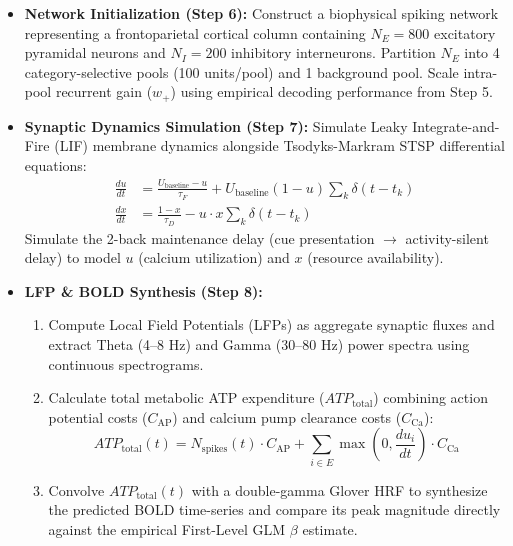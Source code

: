 \documentclass[11pt,a4paper]{article}
\begin{document}
\begin{itemize}
    \item \textbf{Network Initialization (Step 6):} Construct a biophysical spiking network representing a frontoparietal cortical column containing $N_E = 800$ excitatory pyramidal neurons and $N_I = 200$ inhibitory interneurons. Partition $N_E$ into 4 category-selective pools (100 units/pool) and 1 background pool. Scale intra-pool recurrent gain ($w_+$) using empirical decoding performance from Step 5.
    \item \textbf{Synaptic Dynamics Simulation (Step 7):} Simulate Leaky Integrate-and-Fire (LIF) membrane dynamics alongside Tsodyks-Markram STSP differential equations:
    \begin{align}
        \frac{du}{dt} &= \frac{U_{\text{baseline}} - u}{\tau_F} + U_{\text{baseline}}(1 - u) \sum_k \delta(t - t_k) \\
        \frac{dx}{dt} &= \frac{1 - x}{\tau_D} - u \cdot x \sum_k \delta(t - t_k)
    \end{align}
    Simulate the 2-back maintenance delay (cue presentation $\rightarrow$ activity-silent delay) to model $u$ (calcium utilization) and $x$ (resource availability).
    \item \textbf{LFP \& BOLD Synthesis (Step 8):}
    \begin{enumerate}
        \item Compute Local Field Potentials (LFPs) as aggregate synaptic fluxes and extract Theta (4--8 Hz) and Gamma (30--80 Hz) power spectra using continuous spectrograms.
        \item Calculate total metabolic ATP expenditure ($ATP_{\text{total}}$) combining action potential costs ($C_{\text{AP}}$) and calcium pump clearance costs ($C_{\text{Ca}}$):
        \[
        ATP_{\text{total}}(t) = N_{\text{spikes}}(t) \cdot C_{\text{AP}} + \sum_{i \in E} \max\left(0, \frac{du_i}{dt}\right) \cdot C_{\text{Ca}}
        \]
        \item Convolve $ATP_{\text{total}}(t)$ with a double-gamma Glover HRF to synthesize the predicted BOLD time-series and compare its peak magnitude directly against the empirical First-Level GLM $\beta$ estimate.
    \end{enumerate}
\end{itemize}

\begin{center}
\end{center}
\end{document}
